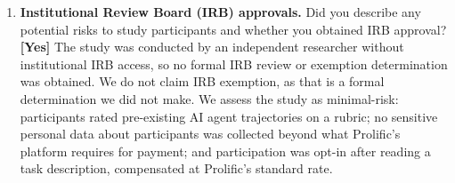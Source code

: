 \documentclass{article}
\newcommand{\answerYes}[1]{\textbf{[Yes]} #1}
\begin{document}
\begin{enumerate}
\item[\textbf{15.}] \textbf{Institutional Review Board (IRB) approvals.}
Did you describe any potential risks to study participants and whether
you obtained IRB approval?
\answerYes{The study was conducted by an independent researcher without
  institutional IRB access, so no formal IRB review or exemption
  determination was obtained. We do not claim IRB exemption, as that is a
  formal determination we did not make. We assess the study as minimal-risk:
  participants rated pre-existing AI agent trajectories on a rubric; no
  sensitive personal data about participants was collected beyond what
  Prolific's platform requires for payment; and participation was opt-in
  after reading a task description, compensated at Prolific's standard rate.}

\end{enumerate}
\end{document}
